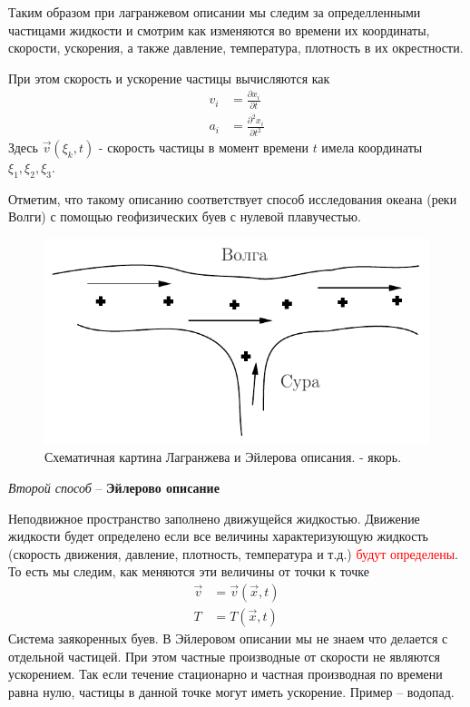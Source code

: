 Таким образом при лагранжевом описании мы следим за определленными частицами жидкости и смотрим как изменяются во времени их координаты,  скорости, ускорения, а также давление, температура, плотность в их окрестности.

При этом скорость и ускорение частицы вычисляются как
\begin{align*}
v_{i} &=\frac{\partial x_{i}}{\partial t} \\
a_{i} &=\frac{\partial^{2} x_{i}}{\partial t^{2}} 
\end{align*}
Здесь $ \vec{v}\left(\xi_{k}, t\right) $ - скорость частицы в момент времени $t$ имела координаты $\xi_1,\xi_2,\xi_3$.

Отметим, что такому описанию соответствует способ исследования океана (реки Волги) с помощью геофизических буев с нулевой плавучестью.
\begin{figure}[h]
	\centering
	\includegraphics[scale=1]{photo/3.pdf}
	\caption{Схематичная картина Лагранжева и Эйлерова описания.  - якорь.}
	\label{fig:figure3}
\end{figure}
\begin{center}
	{\emph{Второй способ} – \textbf{Эйлерово описание}}
\end{center}

Неподвижное пространство заполнено движущейся жидкостью. Движение жидкости будет определено если все величины характеризующую жидкость (скорость движения, давление, плотность, температура и т.д.) \textcolor{red}{будут определены}.
То есть мы следим, как меняются эти величины от точки к точке
\begin{align*} 
\vec{v} &=\vec{v}(\vec{x}, t) \\
T &=T(\vec{x}, t)
\end{align*}
Система заякоренных буев. 
В Эйлеровом описании мы не знаем что делается с отдельной частицей. При этом частные производные от скорости не являются ускорением. Так если течение стационарно и частная производная по времени  равна нулю, частицы в данной точке могут иметь ускорение. Пример – водопад.

